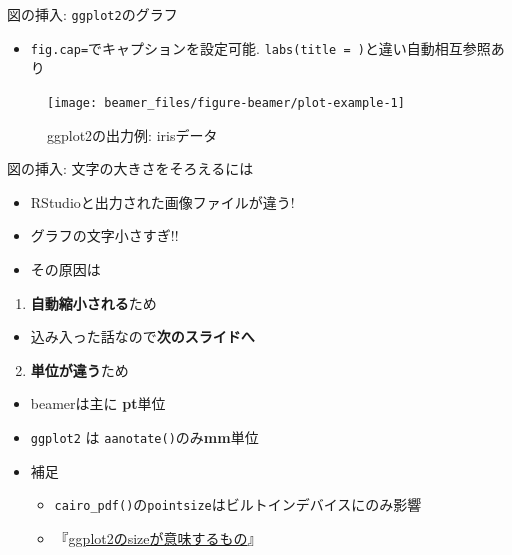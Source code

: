 \documentclass[
  12pt,
  ignorenonframetext,
]{beamer}
\providecommand{\tightlist}{%
  \setlength{\itemsep}{0pt}\setlength{\parskip}{0pt}}
\begin{document}
\begin{frame}[fragile]{図の挿入: \texttt{ggplot2}のグラフ}
\protect\hypertarget{ux56f3ux306eux633fux5165-ggplot2ux306eux30b0ux30e9ux30d5}{}

\begin{itemize}
\tightlist
\item
  \texttt{fig.cap=}でキャプションを設定可能.
  \texttt{labs(title\ =\ )}と違い自動相互参照あり
\end{itemize}

\begin{figure}

{\centering \texttt{[image: beamer\_files/figure-beamer/plot-example-1]} 

}

\caption{ggplot2の出力例: irisデータ}\label{fig:plot-example}
\end{figure}

\end{frame}

\begin{frame}[fragile]{図の挿入: 文字の大きさをそろえるには}
\protect\hypertarget{ux56f3ux306eux633fux5165-ux6587ux5b57ux306eux5927ux304dux3055ux3092ux305dux308dux3048ux308bux306bux306f}{}

\begin{itemize}
\tightlist
\item
  RStudioと出力された画像ファイルが違う!
\item
  グラフの文字小さすぎ!!
\item
  その原因は
\end{itemize}

\begin{enumerate}
\tightlist
\item
  \textbf{自動縮小される}ため
\end{enumerate}

\begin{itemize}
\tightlist
\item
  込み入った話なので\textbf{次のスライドへ}
\end{itemize}

\begin{enumerate}
\setcounter{enumi}{1}
\tightlist
\item
  \textbf{単位が違う}ため
\end{enumerate}

\begin{itemize}
\tightlist
\item
  beamerは主に \textbf{pt}単位
\item
  \texttt{ggplot2} は \texttt{aanotate()}のみ\textbf{mm}単位
\item
  補足

  \begin{itemize}
  \tightlist
  \item
    \texttt{cairo\_pdf()}の\texttt{pointsize}はビルトインデバイスにのみ影響
  \item
    『\href{https://uribo.hatenablog.com/entry/2018/06/11/232041}{ggplot2のsizeが意味するもの}』
  \end{itemize}
\end{itemize}

\end{frame}
\end{document}
